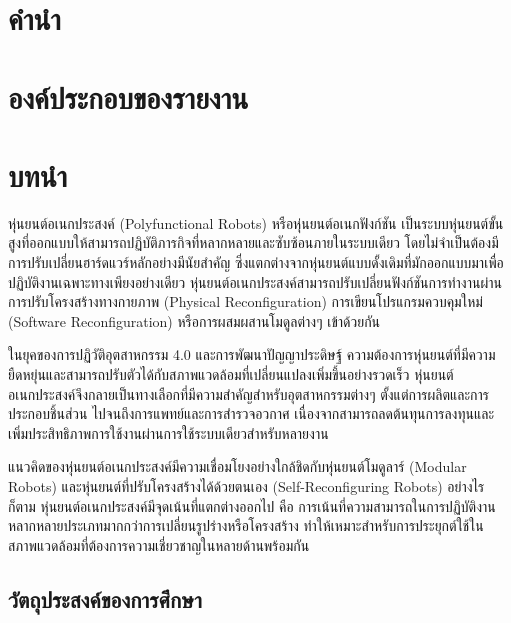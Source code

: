 \documentclass[a4paper]{article}
\begin{document}
\setcounter{page}{1}

\section*{คำนำ}

\newpage

\section*{องค์ประกอบของรายงาน}

\newpage

\section{บทนำ}
หุ่นยนต์อเนกประสงค์ (Polyfunctional Robots) หรือหุ่นยนต์อเนกฟังก์ชัน เป็นระบบหุ่นยนต์ขั้นสูงที่ออกแบบให้สามารถปฏิบัติภารกิจที่หลากหลายและซับซ้อนภายในระบบเดียว โดยไม่จำเป็นต้องมีการปรับเปลี่ยนฮาร์ดแวร์หลักอย่างมีนัยสำคัญ \parencite{liang2025decoding} ซึ่งแตกต่างจากหุ่นยนต์แบบดั้งเดิมที่มักออกแบบมาเพื่อปฏิบัติงานเฉพาะทางเพียงอย่างเดียว หุ่นยนต์อเนกประสงค์สามารถปรับเปลี่ยนฟังก์ชันการทำงานผ่านการปรับโครงสร้างทางกายภาพ (Physical Reconfiguration) การเขียนโปรแกรมควบคุมใหม่ (Software Reconfiguration) หรือการผสมผสานโมดูลต่างๆ เข้าด้วยกัน \parencite{post2023modular}

ในยุคของการปฏิวัติอุตสาหกรรม 4.0 และการพัฒนาปัญญาประดิษฐ์ ความต้องการหุ่นยนต์ที่มีความยืดหยุ่นและสามารถปรับตัวได้กับสภาพแวดล้อมที่เปลี่ยนแปลงเพิ่มขึ้นอย่างรวดเร็ว \parencite{mohammadi2023mobile} หุ่นยนต์อเนกประสงค์จึงกลายเป็นทางเลือกที่มีความสำคัญสำหรับอุตสาหกรรมต่างๆ ตั้งแต่การผลิตและการประกอบชิ้นส่วน ไปจนถึงการแพทย์และการสำรวจอวกาศ เนื่องจากสามารถลดต้นทุนการลงทุนและเพิ่มประสิทธิภาพการใช้งานผ่านการใช้ระบบเดียวสำหรับหลายงาน

แนวคิดของหุ่นยนต์อเนกประสงค์มีความเชื่อมโยงอย่างใกล้ชิดกับหุ่นยนต์โมดูลาร์ (Modular Robots) และหุ่นยนต์ที่ปรับโครงสร้างได้ด้วยตนเอง (Self-Reconfiguring Robots) \parencite{seo2019modular} อย่างไรก็ตาม หุ่นยนต์อเนกประสงค์มีจุดเน้นที่แตกต่างออกไป คือ การเน้นที่ความสามารถในการปฏิบัติงานหลากหลายประเภทมากกว่าการเปลี่ยนรูปร่างหรือโครงสร้าง ทำให้เหมาะสำหรับการประยุกต์ใช้ในสภาพแวดล้อมที่ต้องการความเชี่ยวชาญในหลายด้านพร้อมกัน

\subsection{วัตถุประสงค์ของการศึกษา}
\end{document}
